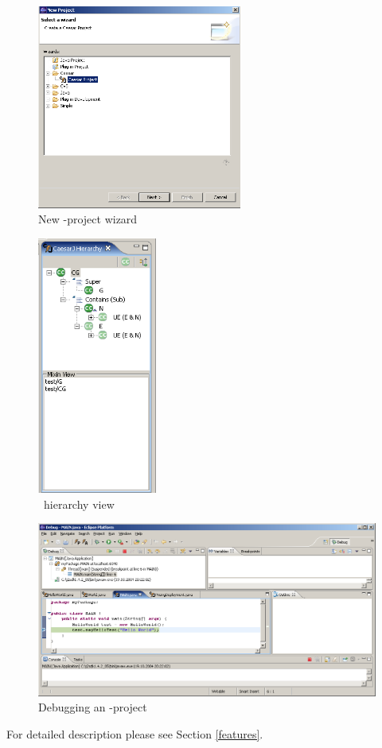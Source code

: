\begin{figure}[htbp]
	\centering
		\includegraphics[width=0.60\textwidth]{images/project_wizard.png}
	\caption{New \caesarj -project wizard}
	\label{fig:projectwizard}
\end{figure} 

\begin{figure}[htbp]
	\centering
		\includegraphics[width=0.35\textwidth]{images/hierarchy.png}
	\caption{\caesarj ~hierarchy view}
	\label{fig:hierarchy}
\end{figure} 

\begin{figure}[htbp]
	\centering
		\includegraphics[width=1.0\textwidth]{images/debug1.png}
	\caption{Debugging an \caesarj -project}
	\label{fig:debug1}
\end{figure}


For detailed description please see Section \ref{features}.